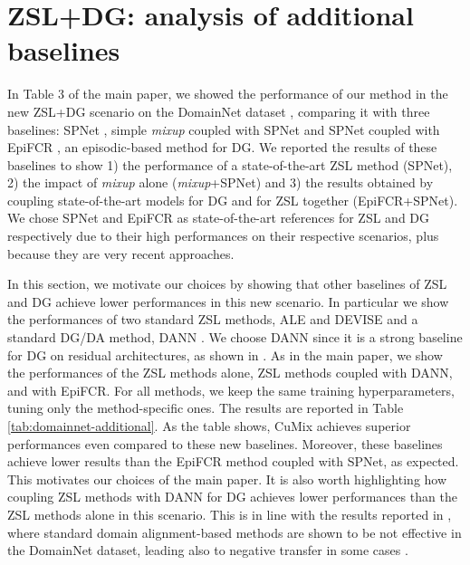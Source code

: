 \documentclass[runningheads]{llncs}
\newcommand{\methodName}{{CuMix} }
\begin{document}
\section{ZSL+DG: analysis of additional baselines}
 In Table 3 of the main paper, we showed the performance of our method in the new ZSL+DG scenario on the DomainNet dataset \cite{peng2019moment}, comparing it with three baselines: SPNet \cite{xian2019semantic}, simple \textit{mixup} \cite{zhang2017mixup} coupled with SPNet and SPNet coupled with EpiFCR \cite{li2019episodic}, an episodic-based method for DG. We reported the results of these baselines to show 1) the performance of a state-of-the-art ZSL method (SPNet), 2) the impact of \textit{mixup} alone (\textit{mixup}+SPNet) and 3) the results obtained by coupling state-of-the-art models for DG and for ZSL together (EpiFCR+SPNet). We chose SPNet and EpiFCR as state-of-the-art references for ZSL and DG respectively due to their high performances on their respective scenarios, plus because they are very recent approaches. 

In this section, we motivate our choices by showing that other baselines of ZSL and DG achieve lower performances in this new scenario. In particular we show the performances of two standard ZSL methods, ALE \cite{akata2013label} and DEVISE \cite{frome2013devise} and a standard DG/DA method, DANN \cite{ganin2016domain}. We choose DANN since it is a strong baseline for DG on residual architectures, as shown in \cite{li2019episodic}. As in the main paper, we show the performances of the ZSL methods alone, ZSL methods coupled with DANN, and with EpiFCR. For all methods, we keep the same training hyperparameters, tuning only the method-specific ones. The results are reported in Table \ref{tab:domainnet-additional}. As the table shows, \methodName achieves superior performances even compared to these new baselines. Moreover, these baselines achieve lower results than the EpiFCR method coupled with SPNet, as expected. This motivates our choices of the main paper. It is also worth highlighting how coupling ZSL methods with DANN for DG achieves lower performances than the ZSL methods alone in this scenario. This is in line with the results reported in \cite{peng2019moment}, where standard domain alignment-based methods are shown to be not effective in the DomainNet dataset, leading also to negative transfer in some cases \cite{peng2019moment}.
\end{document}
